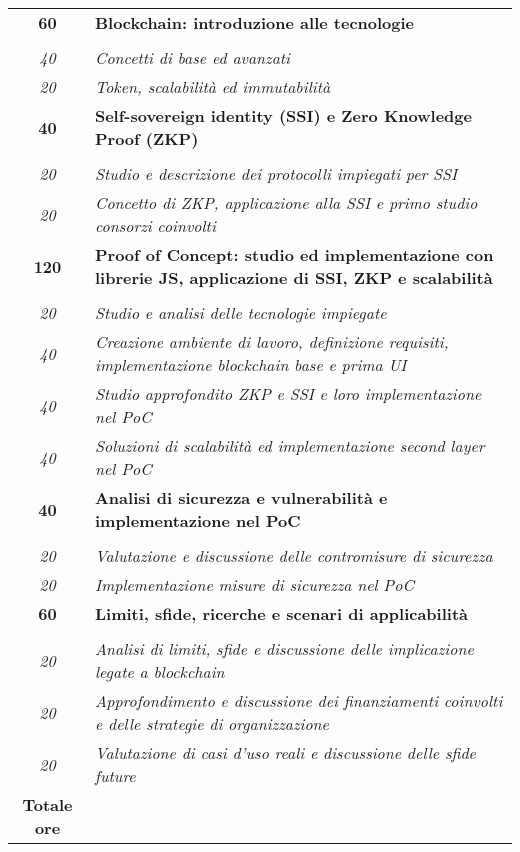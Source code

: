 

\begin{tabularx}{\textwidth}{|c|X|}
	\hline

    \textbf{60} & \textbf{Blockchain: introduzione alle tecnologie} \\ \hdashline 
    \multirow{2}{0cm}\\ 
    \textit{40} & 
    \textit{Concetti di base ed avanzati} \\
    \textit{20} & 
    \textit{Token, scalabilità ed immutabilità} \\
    \hline

    \textbf{40} & \textbf{Self-sovereign identity (SSI) e Zero Knowledge Proof (ZKP)} \\ \hdashline 
    \multirow{2}{0cm}\\ 
    \textit{20} & 
    \textit{Studio e descrizione dei protocolli impiegati per SSI} \\
    \textit{20} & 
    \textit{Concetto di ZKP, applicazione alla SSI e primo studio consorzi coinvolti} \\
    \hline

    \textbf{120} & \textbf{Proof of Concept: studio ed implementazione con librerie JS, applicazione di SSI, ZKP e scalabilità} \\ \hdashline 
    \multirow{4}{0cm}\\ 
    \textit{20} & 
    \textit{Studio e analisi delle tecnologie impiegate} \\
    \textit{40} & 
    \textit{Creazione ambiente di lavoro, definizione requisiti, implementazione blockchain base e prima UI} \\
    \textit{40} & 
    \textit{Studio approfondito ZKP e SSI e loro implementazione nel PoC} \\
    \textit{40} & 
    \textit{Soluzioni di scalabilità ed implementazione second layer nel PoC} \\
    \hline

    \textbf{40} & \textbf{Analisi di sicurezza e vulnerabilità e implementazione nel PoC} \\ \hdashline 
    \multirow{2}{0cm}\\ 
    \textit{20} & 
    \textit{Valutazione e discussione delle contromisure di sicurezza} \\
    \textit{20} & 
    \textit{Implementazione misure di sicurezza nel PoC} \\
    \hline

    \textbf{60} & \textbf{Limiti, sfide, ricerche e scenari di applicabilità} \\ \hdashline 
    \multirow{3}{0cm}\\ 
    \textit{20} & 
    \textit{Analisi di limiti, sfide e discussione delle implicazione legate a blockchain} \\
    \textit{20} & 
    \textit{Approfondimento e discussione dei finanziamenti coinvolti e delle strategie di organizzazione} \\
    \textit{20} & 
    \textit{Valutazione di casi d'uso reali e discussione delle sfide future} \\
    \hline
	
	\textbf{Totale ore} & \multicolumn{1}{|c|}{\textbf{\totaleOre}} \\\hline
	
	
\end{tabularx}